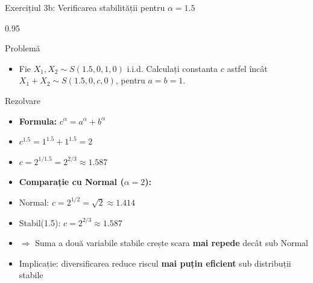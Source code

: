 \documentclass[9pt, aspectratio=169, t]{beamer}
\begin{document}
\begin{frame}{Exercițiul 3b: Verificarea stabilității pentru $\alpha = 1.5$}
    \begin{cminipage}{0.95\textwidth}
\begin{block}{Problemă}
\begin{itemize}\setlength{\itemsep}{0pt}
    \item Fie $X_1, X_2 \sim S(1.5, 0, 1, 0)$ i.i.d. Calculați constanta $c$ astfel încât $X_1 + X_2 \sim S(1.5, 0, c, 0)$, pentru $a = b = 1$.
\end{itemize}
\end{block}

\begin{exampleblock}{Rezolvare}
\begin{itemize}\setlength{\itemsep}{0pt}
    \item \textbf{Formula:} $c^\alpha = a^\alpha + b^\alpha$
    \item $c^{1.5} = 1^{1.5} + 1^{1.5} = 2$
    \item $c = 2^{1/1.5} = 2^{2/3} \approx \mathbf{1.587}$
\end{itemize}

\vspace{0.2cm}
\begin{itemize}\setlength{\itemsep}{0pt}
    \item \textbf{Comparație cu Normal ($\alpha = 2$):}
    \item Normal: $c = 2^{1/2} = \sqrt{2} \approx 1.414$
    \item Stabil(1.5): $c = 2^{2/3} \approx 1.587$
    \item $\Rightarrow$ Suma a două variabile stabile crește scara \textbf{mai repede} decât sub Normal
    \item Implicație: diversificarea reduce riscul \textbf{mai puțin eficient} sub distribuții stabile
\end{itemize}
\end{exampleblock}
    \end{cminipage}
\end{frame}
\end{document}
